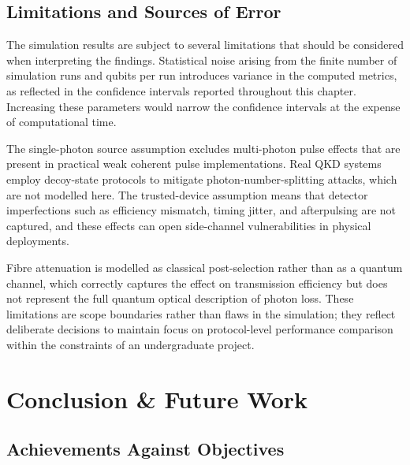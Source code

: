 \documentclass[10pt, a4paper]{report}
\begin{document}
\section{Limitations and Sources of Error}
\label{sec:limitations-results}

The simulation results are subject to several limitations that should be considered when interpreting the findings. Statistical noise arising from the finite number of simulation runs and qubits per run introduces variance in the computed metrics, as reflected in the confidence intervals reported throughout this chapter. Increasing these parameters would narrow the confidence intervals at the expense of computational time.

The single-photon source assumption excludes multi-photon pulse effects that are present in practical weak coherent pulse implementations. Real QKD systems employ decoy-state protocols to mitigate photon-number-splitting attacks, which are not modelled here. The trusted-device assumption means that detector imperfections such as efficiency mismatch, timing jitter, and afterpulsing are not captured, and these effects can open side-channel vulnerabilities in physical deployments.

Fibre attenuation is modelled as classical post-selection rather than as a quantum channel, which correctly captures the effect on transmission efficiency but does not represent the full quantum optical description of photon loss. These limitations are scope boundaries rather than flaws in the simulation; they reflect deliberate decisions to maintain focus on protocol-level performance comparison within the constraints of an undergraduate project.


\chapter{Conclusion \& Future Work}


\section{Achievements Against Objectives}
\end{document}
